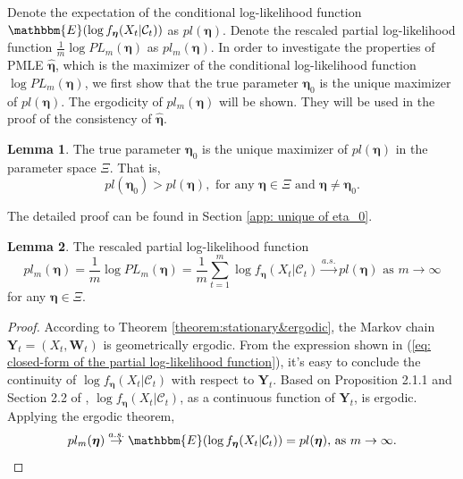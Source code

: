 \documentclass{article}
\theoremstyle{definition}
\newtheorem{lemma}{Lemma}[section]
\begin{document}
Denote the expectation of the conditional log-likelihood function $\mathbbm{E}(\log f_{\bm{\eta}}(X_t|\mathcal{C}_t))$ as $pl(\bm{\eta})$. Denote the rescaled partial log-likelihood function $\frac{1}{m} \log PL_m(\bm{\eta})$ as $pl_m(\bm{\eta})$. In order to investigate the properties of PMLE $\hat{\bm{\eta}}$, which is the maximizer of the conditional log-likelihood function $\log PL_m(\bm{\eta})$, we first show that the true parameter $\bm{\eta}_0$ is the unique maximizer of $pl(\bm{\eta})$. The ergodicity of $pl_m(\bm{\eta})$ will be shown. They will be used in the proof of the consistency of $\hat{\bm{\eta}}$. 

\begin{lemma}
\label{lemma: unique of eta_0}
The true parameter $\bm{\eta}_0$ is the unique maximizer of $pl(\bm{\eta})$ in the parameter space $\Xi$. That is, 
\begin{equation*}
    pl(\bm{\eta}_0)>pl(\bm{\eta}), \text{ for any } \bm{\eta} \in \Xi \text{ and } \bm{\eta} \neq \bm{\eta}_0. 
\end{equation*}
\end{lemma}
The detailed proof can be found in Section \ref{app: unique of eta_0}.


\begin{lemma}
\label{lemma: ergodicity of log-partial likelihood}
The rescaled partial log-likelihood function
\begin{equation*}
pl_m(\bm{\eta}) = \frac{1}{m}\log PL_m(\bm{\eta}) = \frac{1}{m} \sum_{t=1}^m \log f_{\bm{\eta}}(X_t|\mathcal{C}_{t}) \overset{a.s.}{\rightarrow} pl(\bm{\eta}) \text{ as }m \rightarrow \infty
\end{equation*}
for any $\bm{\eta} \in \Xi$.
\end{lemma}

\begin{proof}
According to Theorem \ref{theorem:stationary&ergodic}, the Markov chain $\bm{Y}_t = (X_t, \bm{W}_t)$ is geometrically ergodic. From the expression shown in (\ref{eq: closed-form of the partial log-likelihood function}), it's easy to conclude the continuity of $\log f_{\bm{\eta}}(X_t|\mathcal{C}_t)$ with respect to $\bm{Y}_t$. Based on Proposition 2.1.1 and Section 2.2 of \cite{Strauman2005Daniel}, $\log f_{\bm{\eta}}(X_t|\mathcal{C}_t)$, as a continuous function of $\bm{Y}_t$, is ergodic. Applying the ergodic theorem,
\begin{equation*}
pl_m(\bm{\eta})\overset{a.s.}{\rightarrow} \mathbbm{E}(\log f_{\bm{\eta}}(X_t|\mathcal{C}_t)) = pl(\bm{\eta}) \text{, as }m \rightarrow \infty.
\end{equation*}
\end{proof}
\end{document}
